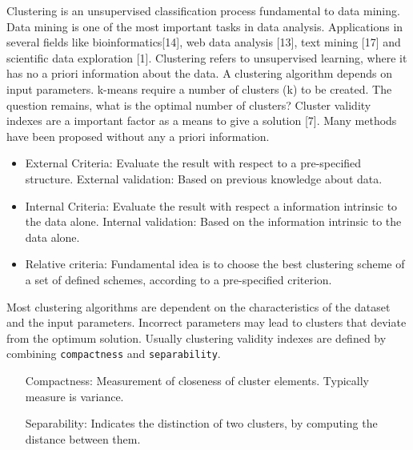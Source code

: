 \documentclass[a4paper,10pt]{article}
\begin{document}
Clustering is an unsupervised classification process fundamental to data mining. Data mining is one of the most important tasks in data analysis. Applications in several fields like bioinformatics[14], web data analysis [13], text mining [17] and scientific data exploration [1]. Clustering refers to unsupervised learning, where it has no a priori information about the data. A clustering algorithm depends on input parameters. k-means require a number of clusters (k) to be created. The question remains, what is the optimal number of clusters? Cluster validity indexes are a important factor as a means to give a solution [7]. Many methods have been proposed without any a priori information.
\begin{itemize}
	\item External Criteria: Evaluate the result with respect to a pre-specified structure.
		\subitem External validation: Based on previous knowledge about data.
	\item Internal Criteria: Evaluate the result with respect a information intrinsic to the data alone.
		\subitem Internal validation: Based on the information intrinsic to the data alone.
	\item Relative criteria: Fundamental idea is to choose the best clustering scheme of a set of defined schemes, according to a pre-specified criterion.
\end{itemize}
Most clustering algorithms are dependent on the characteristics of the dataset and the input parameters. Incorrect parameters may lead to clusters that deviate from the optimum solution. Usually clustering validity indexes are defined by combining \texttt{compactness} and \texttt{separability}.
\begin{itemize}
	\item [Compactness:] Measurement of closeness of cluster elements. Typically measure is variance.
	\item [Separability:] Indicates the distinction of two clusters, by computing the distance between them.
\end{itemize}
\end{document}
